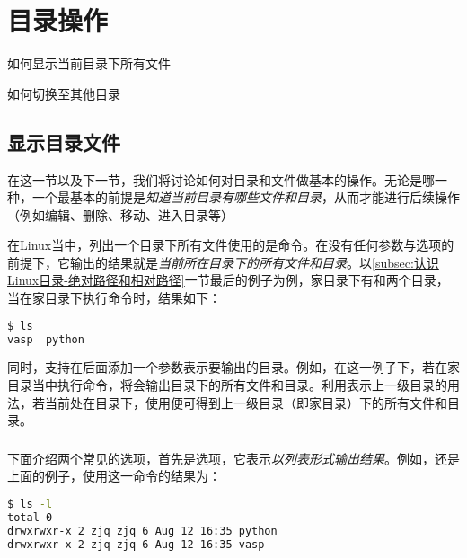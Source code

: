 \section{目录操作}\label{sec:目录操作}

\begin{Abstract}
    \item 如何显示当前目录下所有文件
    \item 如何切换至其他目录
\end{Abstract}


\subsection{显示目录文件}\label{subsec:目录操作-显示目录文件}

在这一节以及下一节，我们将讨论如何对目录和文件做基本的操作。无论是哪一种，一个最基本的前提是\emph{知道当前目录有哪些文件和目录}，从而才能进行后续操作（例如编辑、删除、移动、进入目录等）

在Linux当中，列出一个目录下所有文件使用的是命令。在没有任何参数与选项的前提下，它输出的结果就是\emph{当前所在目录下的所有文件和目录}。以\ref{subsec:认识Linux目录-绝对路径和相对路径}一节最后的例子为例，家目录下有和两个目录，当在家目录下执行命令时，结果如下：

\begin{lstlisting}[language=bash]
$ ls
vasp  python
\end{lstlisting}

同时，支持在后面添加一个参数表示要输出的目录。例如，在这一例子下，若在家目录当中执行命令，将会输出目录下的所有文件和目录。利用表示上一级目录的用法，若当前处在目录下，使用便可得到上一级目录（即家目录）下的所有文件和目录。

\subsubsection{}

下面介绍两个常见的选项，首先是选项，它表示\emph{以列表形式输出结果}。例如，还是上面的例子，使用这一命令的结果为：

\begin{lstlisting}[language=bash]
$ ls -l
total 0
drwxrwxr-x 2 zjq zjq 6 Aug 12 16:35 python
drwxrwxr-x 2 zjq zjq 6 Aug 12 16:35 vasp
\end{lstlisting}

